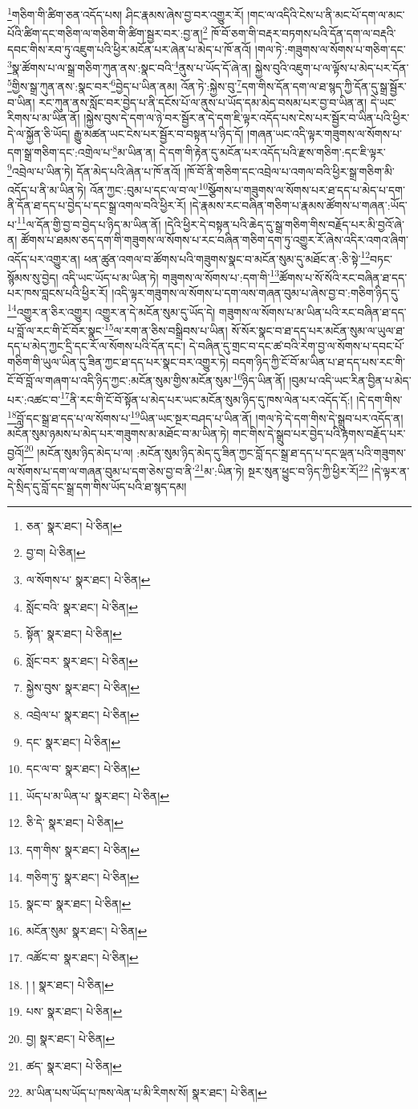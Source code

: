 \footnote{ཅན་  སྣར་ཐང་།  པེ་ཅིན། }གཅིག་གི་ཚིག་ཅན་འདོད་པས། ཤིང་རྣམས་ཞེས་བྱ་བར་འགྱུར་རོ། །གང་ལ་འདིའི་ངེས་པ་ནི་མང་པོ་དག་ལ་མང་པོའི་ཚིག་དང་གཅིག་ལ་གཅིག་གི་ཚིག་སྦྱར་བར་:བྱ་ན།\footnote{བྱ་བ།  པེ་ཅིན། } ཁོ་བོ་ཅག་གི་བརྡར་བཏགས་པའི་དོན་དག་ལ་བརྡའི་དབང་གིས་རབ་ཏུ་འཇུག་པའི་ཕྱིར་མངོན་པར་ཞེན་པ་མེད་པ་ཁོ་ནའོ། །གལ་ཏེ་:གཟུགས་ལ་སོགས་པ་གཅིག་དང་\footnote{ལ་སོགས་པ་  སྣར་ཐང་།  པེ་ཅིན། }སྣ་ཚོགས་པ་ལ་སྒྲ་གཅིག་ཀུན་ནས་:སྣང་བའི་\footnote{སློང་བའི་  སྣར་ཐང་།  པེ་ཅིན། }ནུས་པ་ཡོད་དོ་ཞེ་ན། སྐྱེས་བུའི་འཇུག་པ་ལ་ལྟོས་པ་མེད་པར་དོན་\footnote{སྟོན་  སྣར་ཐང་།  པེ་ཅིན། }གྱིས་སྒྲ་ཀུན་ནས་:སྣང་བར་\footnote{སློང་བར་  སྣར་ཐང་།  པེ་ཅིན། }བྱེད་པ་ཡིན་ནམ། འོན་ཏེ་:སྐྱེས་བུ་\footnote{སྐྱེས་བུས་  སྣར་ཐང་།  པེ་ཅིན། }དག་གིས་དོན་དག་ལ་ཐ་སྙད་ཀྱི་དོན་དུ་སྒྲ་སྦྱོར་བ་ཡིན། རང་ཀུན་ནས་སློང་བར་བྱེད་པ་ནི་དངོས་པོ་ལ་ནུས་པ་ཡོད་དམ་མེད་བསམ་པར་བྱ་བ་ཡིན་ན། དེ་ཡང་རིགས་པ་མ་ཡིན་ནོ། །སྐྱེས་བུས་དེ་དག་ལ་ཉེ་བར་སྦྱོར་ན་དེ་དག་ཇི་ལྟར་འདོད་པས་ངེས་པར་སྦྱོར་བ་ཡིན་པའི་ཕྱིར་དེ་ལ་སྐྱོན་ཅི་ཡོད། རྒྱུ་མཚན་ཡང་ངེས་པར་སྦྱོར་བ་བསྟན་པ་ཉིད་དོ། །གཞན་ཡང་འདི་ལྟར་གཟུགས་ལ་སོགས་པ་དག་སྒྲ་གཅིག་དང་:འགྲེལ་པ་\footnote{འབྲེལ་པ་  སྣར་ཐང་།  པེ་ཅིན། }མ་ཡིན་ན། དེ་དག་གི་རྟེན་དུ་མངོན་པར་འདོད་པའི་རྫས་གཅིག་:དང་ཇི་ལྟར་\footnote{དང་  སྣར་ཐང་།  པེ་ཅིན། }འབྲེལ་པ་ཡིན་ཏེ། དོན་མེད་པའི་ཞེན་པ་ཁོ་ནའོ། །ཁོ་བོ་ནི་གཅིག་དང་འབྲེལ་པ་འགལ་བའི་ཕྱིར་སྒྲ་གཅིག་མི་འདོད་པ་ནི་མ་ཡིན་ཏེ། འོན་ཀྱང་:བུམ་པ་དང་ལ་བ་ལ་\footnote{དང་ལ་བ་  སྣར་ཐང་།  པེ་ཅིན། }སྩོགས་པ་གཟུགས་ལ་སོགས་པར་ཐ་དད་པ་མེད་པ་དག་ནི་དོན་ཐ་དད་པ་བྱེད་པ་དང་སྒྲ་འགལ་བའི་ཕྱིར་རོ། །དེ་རྣམས་རང་བཞིན་གཅིག་པ་རྣམས་ཚོགས་པ་གཞན་:ཡོད་པ་\footnote{ཡོད་པ་མ་ཡིན་པ་  སྣར་ཐང་།  པེ་ཅིན། }ལ་དོན་གྱི་བྱ་བ་བྱེད་པ་ཉིད་མ་ཡིན་ནོ། །དེའི་ཕྱིར་དེ་བསྟན་པའི་ཆེད་དུ་སྒྲ་གཅིག་གིས་བརྗོད་པར་མི་བྱའོ་ཞེ་ན། ཚོགས་པ་ཐམས་ཅད་དག་གི་གཟུགས་ལ་སོགས་པ་རང་བཞིན་གཅིག་དག་ཏུ་འགྱུར་རོ་ཞེས་འདིར་འགའ་ཞིག་འདོད་པར་འགྱུར་ན། ཕན་ཚུན་འགལ་བ་ཚོགས་པའི་གཟུགས་སྣང་བ་མངོན་སུམ་དུ་མཐོང་ན་:ཅི་སྟེ་\footnote{ཅི་དེ་  སྣར་ཐང་།  པེ་ཅིན། }བཏང་སྙོམས་སུ་བྱེད། འདི་ཡང་ཡོད་པ་མ་ཡིན་ཏེ། གཟུགས་ལ་སོགས་པ་:དག་གི་\footnote{དག་གིས་  སྣར་ཐང་།  པེ་ཅིན། }ཚོགས་པ་སོ་སོའི་རང་བཞིན་ཐ་དད་པར་ཁས་བླངས་པའི་ཕྱིར་རོ། །འདི་ལྟར་གཟུགས་ལ་སོགས་པ་དག་ལས་གཞན་བུམ་པ་ཞེས་བྱ་བ་:གཅིག་ཉིད་དུ་\footnote{གཅིག་ཏུ་  སྣར་ཐང་།  པེ་ཅིན། }འགྱུར་ན་ཅིར་འགྱུར། འགྱུར་ན་དེ་མངོན་སུམ་དུ་ཡོད་དེ། གཟུགས་ལ་སོགས་པ་མ་ཡིན་པའི་རང་བཞིན་ཐ་དད་པ་བློ་ལ་རང་གི་ངོ་བོར་སྣང་\footnote{སྣང་བ་  སྣར་ཐང་།  པེ་ཅིན། }ལ་རག་ན་ཅིས་བསྒྲིབས་པ་ཡིན། སོ་སོར་སྣང་བ་ཐ་དད་པར་མངོན་སུམ་ལ་ཡུལ་ཐ་དད་པ་མེད་ཀྱང་དྲི་དང་རོ་ལ་སོགས་པའི་དོན་དང་། དེ་བཞིན་དུ་གྲང་བ་དང་ཚ་བའི་རེག་བྱ་ལ་སོགས་པ་དབང་པོ་གཅིག་གི་ཡུལ་ཡིན་དུ་ཟིན་ཀྱང་ཐ་དད་པར་སྣང་བར་འགྱུར་ཏེ། བདག་ཉིད་ཀྱི་ངོ་བོ་མ་ཡིན་པ་ཐ་དད་པས་རང་གི་ངོ་བོ་བློ་ལ་གཞག་པ་འདི་ཉིད་ཀྱང་:མངོན་སུམ་གྱིས་མངོན་སུམ་\footnote{མངོན་སུམ་  སྣར་ཐང་།  པེ་ཅིན། }ཉིད་ཡིན་ནོ། །བུམ་པ་འདི་ཡང་རིན་བྱིན་པ་མེད་པར་:འཚང་བ་\footnote{འཚོང་བ་  སྣར་ཐང་།  པེ་ཅིན། }ནི་རང་གི་ངོ་བོ་སྟོན་པ་མེད་པར་ཡང་མངོན་སུམ་ཉིད་དུ་ཁས་ལེན་པར་འདོད་དོ:། །དེ་དག་གིས་\footnote{། །  སྣར་ཐང་།  པེ་ཅིན། }བློ་དང་སྒྲ་ཐ་དད་པ་ལ་སོགས་པ་\footnote{པས་  སྣར་ཐང་།  པེ་ཅིན། }ཡིན་ཡང་སྔར་བཤད་པ་ཡིན་ནོ། །གལ་ཏེ་དེ་དག་གིས་དེ་སྒྲུབ་པར་འདོད་ན། མངོན་སུམ་ཉམས་པ་མེད་པར་གཟུགས་མ་མཐོང་བ་མ་ཡིན་ཏེ། གང་གིས་དེ་སྒྲུབ་པར་བྱེད་པའི་རྟགས་བརྗོད་པར་བྱའོ།\footnote{བྱ།  སྣར་ཐང་།  པེ་ཅིན། } །མངོན་སུམ་ཉིད་མེད་པ་ལ། :མངོན་སུམ་ཉིད་མེད་དུ་ཟིན་ཀྱང་བློ་དང་སྒྲ་ཐ་དད་པ་དང་ལྡན་པའི་གཟུགས་ལ་སོགས་པ་དག་ལ་གཞན་བུམ་པ་དག་ཅེས་བྱ་བ་ནི་\footnote{ཚད་  སྣར་ཐང་།  པེ་ཅིན། }མ་:ཡིན་ཏེ། སྔར་སུན་ཕྱུང་བ་ཉིད་ཀྱི་ཕྱིར་རོ།\footnote{མ་ཡིན་པས་ཡོད་པ་ཁས་ལེན་པ་མི་རིགས་སོ།  སྣར་ཐང་།  པེ་ཅིན། } །དེ་ལྟར་ན་དེ་སྲིད་དུ་བློ་དང་སྒྲ་དག་གིས་ཡོད་པའི་ཐ་སྙད་དམ། 